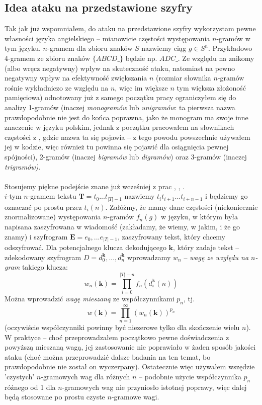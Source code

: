 \documentclass[a4paper]{article}
\theoremstyle{defn}
\theoremstyle{theorem}
\theoremstyle{lemma}
\theoremstyle{cor}
\theoremstyle{fact}
\begin{document}
\subsection{Idea ataku na przedstawione szyfry}
\label{sect4.3}
Tak jak już wspomniałem, do ataku na przedstawione szyfry wykorzystam pewne własności języka angielskiego – mianowicie częstości występowania $n$-gramów w tym języku. $n$-gramem dla zbioru znaków $S$ nazwiemy ciąg $g \in S^n$. Przykładowo 4-gramem ze zbioru znaków $\{ABCD\_\}$ będzie np. $ADC\_$. Ze względu na znikomy (albo wręcz negatywny) wpływ na skuteczność ataku, natomiast na pewno negatywny wpływ na efektywność zwiększania $n$ (rozmiar słownika $n$-gramów rośnie wykładniczo ze względu na $n$, więc im większe $n$ tym większa złożoność pamięciowa) odnotowany już z samego początku pracy ograniczyłem się do analizy 1-gramów (inaczej \textit{monogramów} lub \textit{unigramów}: ta pierwsza nazwa prawdopodobnie nie jest do końca poprawna, jako że monogram ma swoje inne znaczenie w języku polskim, jednak z początku pracowałem na słownikach częstości z \cite{czestosc}, gdzie nazwa ta się pojawia – z tego powodu powszechnie używałem jej w kodzie, więc również tu powinna się pojawić dla osiągnięcia pewnej spójności), 2-gramów (inaczej \textit{bigramów} lub \textit{digramów}) oraz 3-gramów (inaczej \textit{trigramów)}.\\\\
Stosujemy piękne podejście znane już wcześniej z prac \cite{Diaconis}, \cite{Connor}, \cite{Chen&Rosenthal}. \\
$i$-tym $n$-gramem tekstu $\boldsymbol{T} = t_0...t_{|T|-1}$ nazwiemy $t_it_{i+1}...t_{i+n-1}$ i będziemy go oznaczać po prostu przez $t_i(n)$. Załóżmy, że mamy dane częstości (niekoniecznie znormalizowane) występowania $n$-gramów $f_n(g)$ w języku, w którym była napisana zaszyfrowana w wiadomość (zakładamy, że wiemy, w jakim, i że go znamy) i szyfrogram $\boldsymbol{E}=e_0,...e_{|T|-1}$, zaszyfrowany tekst, który chcemy odszyfrować. Dla potencjalnego klucza dekodującego $\boldsymbol{k}$, który zadaje tekst – zdekodowany szyfrogram $D=d_0^{\boldsymbol{k}}, ..., d_n^{\boldsymbol{k}}$ wprowadzamy $w_n$ – \textit{wagę ze względu na $n$-gram} takiego klucza:
$$w_n(\boldsymbol{k}) = \prod\limits_{i=0}^{|T|- n} f_n(d_i^{\boldsymbol{k}}(n))$$
Można wprowadzić \textit{wagę mieszaną} ze współczynnikami $p_n$, tj.
$$w(\boldsymbol{k}) = \prod\limits_{n=1}^{\infty} (w_n(\boldsymbol{k}))^{p_n}$$
(oczywiście współczynniki powinny być niezerowe tylko dla skończenie wielu $n$). W praktyce – choć przeprowadzałem początkowo pewne doświadczenia z powyższą mieszaną wagą, jej zastosowanie nie poprawiało w żaden sposób jakości ataku (choć można przeprowadzić dalsze badania na ten temat, bo prawdopodobnie nie został on wyczerpany). Ostatecznie więc używałem wszędzie 'czystych' $n$-gramowych wag dla różnych $n$ – podobnie użycie współczynnika $p_n$ różnego od 1 dla $n$-gramowych wag nie przyniosło istotnej poprawy, więc dalej będą stosowane po prostu czyste $n$-gramowe wagi.\\
\end{document}
